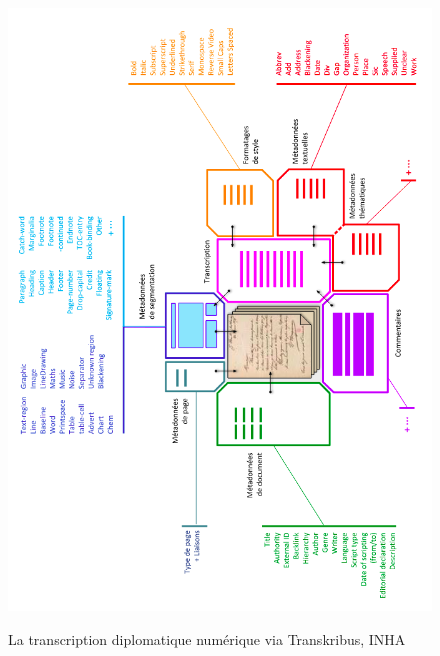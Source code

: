 \begin{figure}[ht]
    \centering
    \caption{La transcription diplomatique numérique via Transkribus, INHA}
    \includegraphics[width=16cm]{images/schema_modele_transkribus_inha2.png}
    \label{schema_modele_transkribus_inha2}
\end{figure}

